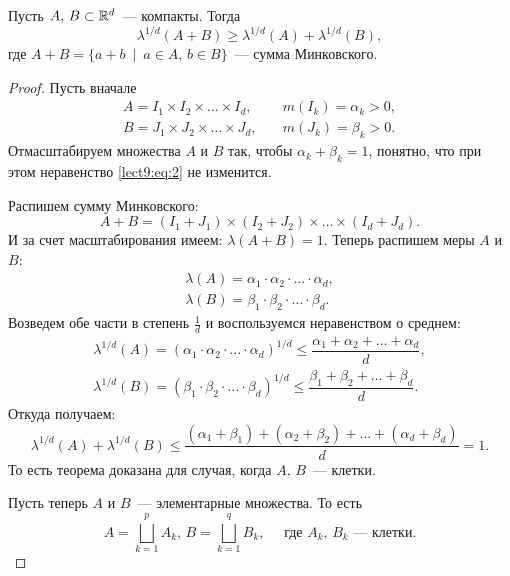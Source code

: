 \begin{theorem}
    Пусть $A,\, B\subset \mathbb{R}^d$~--- компакты. Тогда
    \begin{equation}
        \label{lect9:eq:2}
        \lambda^{1/d}(A+B)\geqslant \lambda^{1/d}(A)+\lambda^{1/d}(B),
    \end{equation}
    где $A+B=\{a+b\ \mid\ a\in A,\, b\in B\}$~--- сумма Минковского.

    \begin{proof}
        Пусть вначале
        \[
            \begin{array}{ll}
                A=I_1\times I_2\times\ldots\times I_d,\quad & m(I_k)=\alpha_k> 0, \\
                B=J_1\times J_2\times\ldots\times J_d,\quad & m(J_k)=\beta_k> 0.
            \end{array}
        \]
        Отмасштабируем множества $A$ и $B$ так, чтобы $\alpha_k+\beta_k=1$, понятно, что при этом
        неравенство \eqref{lect9:eq:2} не изменится.

        Распишем сумму Минковского:
        \[
            A+B=(I_1+J_1)\times(I_2+J_2)\times\ldots\times(I_d+J_d).
        \]
        И за счет масштабирования имеем: $\lambda(A+B)=1$.
        Теперь распишем меры $A$ и $B$:
        \[
            \begin{array}{l}
                \lambda(A)=\alpha_1\cdot\alpha_2\cdot\ldots\cdot\alpha_d, \\
                \lambda(B)=\beta_1\cdot\beta_2\cdot\ldots\cdot\beta_d.
            \end{array}
        \]
        Возведем обе части в степень $\frac{1}{d}$ и воспользуемся неравенством о среднем:
        \[
            \begin{array}{l}
                \lambda^{1/d}(A)=(\alpha_1\cdot\alpha_2\cdot\ldots\cdot\alpha_d)^{1/d}
                \leqslant\dfrac{\alpha_1+\alpha_2+\ldots+\alpha_d}{d}, \\
                \lambda^{1/d}(B)=(\beta_1\cdot\beta_2\cdot\ldots\cdot\beta_d)^{1/d}
                \leqslant\dfrac{\beta_1+\beta_2+\ldots+\beta_d}{d}.
            \end{array}
        \]
        Откуда получаем:
        \[
            \lambda^{1/d}(A)+\lambda^{1/d}(B)\leqslant\dfrac{(\alpha_1+\beta_1)+
                (\alpha_2+\beta_2)+\ldots+(\alpha_d+\beta_d)}{d}=1.
        \]
        То есть теорема доказана для случая, когда $A,\, B$~--- клетки.

        Пусть теперь $A$ и $B$~--- элементарные множества. То есть
        \[
            A = \bigsqcup_{k=1}^p A_k,\, B = \bigsqcup_{k=1}^q B_k,\quad
            \text{ где } A_k,\, B_k\text{~--- клетки}.
        \]


\end{proof}
\end{theorem}
